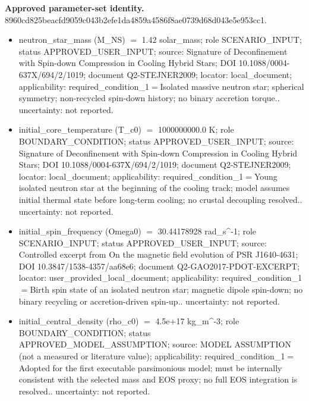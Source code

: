 \documentclass[11pt]{article}
\begin{document}
\noindent\textbf{Approved parameter-set identity.} 8960cd825beacfd9\allowbreak{}059c043b2efe1da4\allowbreak{}859a4586f8ae0739\allowbreak{}d68d043e5e953cc1.
\begin{itemize}\raggedright
\item neutron\_\allowbreak{}star\_\allowbreak{}mass (M\_\allowbreak{}NS) \ensuremath{=} 1.42 solar\_\allowbreak{}mass; role SCENARIO\_\allowbreak{}INPUT; status APPROVED\_\allowbreak{}USER\_\allowbreak{}INPUT; source: Signature of Deconfinement with Spin-down Compression in Cooling Hybrid Stars; DOI 10.1088/\allowbreak{}0004-637X/\allowbreak{}694/\allowbreak{}2/\allowbreak{}1019; document Q2-STEJNER2009; locator: local\_\allowbreak{}document; applicability: required\_\allowbreak{}condition\_\allowbreak{}1\ensuremath{=}Isolated massive neutron star; spherical symmetry; non-recycled spin-down history; no binary accretion torque.. uncertainty: not reported.
\item initial\_\allowbreak{}core\_\allowbreak{}temperature (T\_\allowbreak{}c0) \ensuremath{=} 1000000000.0 K; role BOUNDARY\_\allowbreak{}CONDITION; status APPROVED\_\allowbreak{}USER\_\allowbreak{}INPUT; source: Signature of Deconfinement with Spin-down Compression in Cooling Hybrid Stars; DOI 10.1088/\allowbreak{}0004-637X/\allowbreak{}694/\allowbreak{}2/\allowbreak{}1019; document Q2-STEJNER2009; locator: local\_\allowbreak{}document; applicability: required\_\allowbreak{}condition\_\allowbreak{}1\ensuremath{=}Young isolated neutron star at the beginning of the cooling track; model assumes initial thermal state before long-term cooling; no crustal decoupling resolved.. uncertainty: not reported.
\item initial\_\allowbreak{}spin\_\allowbreak{}frequency (Omega0) \ensuremath{=} 30.44178928 rad\_\allowbreak{}s\textasciicircum{}-1; role SCENARIO\_\allowbreak{}INPUT; status APPROVED\_\allowbreak{}USER\_\allowbreak{}INPUT; source: Controlled excerpt from On the magnetic field evolution of PSR J1640-4631; DOI 10.3847/\allowbreak{}1538-4357/\allowbreak{}aa68e6; document Q2-GAO2017-PDOT-EXCERPT; locator: user\_\allowbreak{}provided\_\allowbreak{}local\_\allowbreak{}document; applicability: required\_\allowbreak{}condition\_\allowbreak{}1\ensuremath{=}Birth spin state of an isolated neutron star; magnetic dipole spin-down; no binary recycling or accretion-driven spin-up.. uncertainty: not reported.
\item initial\_\allowbreak{}central\_\allowbreak{}density (rho\_\allowbreak{}c0) \ensuremath{=} 4.5e+17 kg\_\allowbreak{}m\textasciicircum{}-3; role BOUNDARY\_\allowbreak{}CONDITION; status APPROVED\_\allowbreak{}MODEL\_\allowbreak{}ASSUMPTION; source: MODEL ASSUMPTION (not a measured or literature value); applicability: required\_\allowbreak{}condition\_\allowbreak{}1\ensuremath{=}Adopted for the first executable parsimonious model; must be internally consistent with the selected mass and EOS proxy; no full EOS integration is resolved.. uncertainty: not reported.

\end{itemize}
\end{document}
